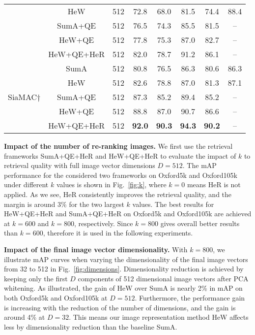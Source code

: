 \documentclass[journal]{IEEEtran}
\begin{document}
\begin{table*}[t]
\begin{center}
\begin{tabular}{|l|c|c| c c c c c|}
                             &HeW                &512     &72.8  &68.0        &81.5     &74.4      &88.4  \\
                             &SumA+QE            &512     &76.5  &74.3        &85.5     &81.5      &--  \\
                             &HeW+QE             &512     &77.8  &75.3        &87.0     &82.7      &--  \\
                             &HeW+QE+HeR         &512     &82.0  &78.7        &91.2     &86.1      &--  \\
  \hline
  \multirow{5}{*}{SiaMAC$\dagger$} &SumA         &512    &80.8  &76.5        &86.3     &80.6      &86.3 \\
                             &HeW                &512    &82.6  &78.8        &87.0     &81.3      &87.1  \\
                             &SumA+QE            &512    &87.3  &85.2        &89.4     &85.2      &--  \\
                             &HeW+QE             &512    &88.8  &87.0        &90.7     &86.6      &--  \\
                             &HeW+QE+HeR         &512    &\textbf{92.0}  &\textbf{90.3}        &\textbf{94.3}     &\textbf{90.2}   &--\\
  \hline
\end{tabular}
\end{center}
\end{table*}

\vspace{0.01in}
\textbf{Impact of the number of re-ranking images.} We first use the retrieval frameworks SumA+QE+HeR and HeW+QE+HeR to evaluate the impact of $k$ to retrieval quality with full image vector dimensions $D=512$.
The mAP performance for the considered two frameworks on Oxford5k and Oxford105k under different $k$ values is shown in Fig.~\ref{fig:k}, where $k=0$ means HeR is not applied.
As we see,  HeR consistently improves the retrieval quality, and the margin is around 3\% for the  two largest $k$ values.
The best results for HeW+QE+HeR and SumA+QE+HeR on Oxford5k and Oxford105k are achieved at $k=600$ and $k=800$,
respectively. Since $k=800$ gives overall better results than $k=600$, therefore it is used in the following experiments.

\vspace{0.01in}
\textbf{Impact of the final image vector dimensionality.} With $k=800$, we illustrate mAP curves when varying the dimensionality of the final image vectors from 32 to 512 in Fig.~\ref{fig:dimensions}.
Dimensionality reduction is achieved by keeping only the first $D$ components of 512 dimensional image vectors after PCA whitening.
As illustrated, the gain of HeW over SumA is nearly 2\% in mAP on both Oxford5k and Oxford105k at $D= 512$.
Furthermore, the performance gain is increasing with the reduction of the number of dimensions, and the gain is around 4\% at $D= 32$.
This means our image representation method HeW affects less by dimensionality reduction than the baseline SumA.
\end{document}
